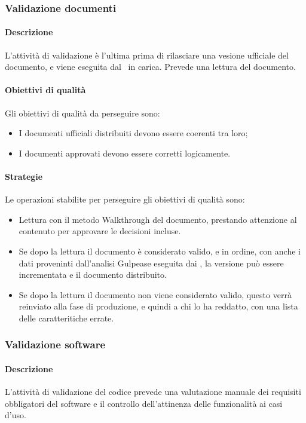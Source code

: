 \documentclass[../NormeDiProgetto_v4.0.0.tex]{subfiles}
\begin{document}
			\subsubsection{Validazione documenti}
				\paragraph{Descrizione}
					L'attività di validazione è l'ultima prima di rilasciare una vesione ufficiale del documento, e viene eseguita dal \responsabilediprogetto\ in carica.
					Prevede una lettura del documento. 
				\paragraph{Obiettivi di qualità}
				Gli obiettivi di qualità da perseguire sono:
				\begin{itemize}
					\item I documenti ufficiali distribuiti devono essere coerenti tra loro;
					\item I documenti approvati devono essere corretti logicamente.
				\end{itemize}

				\paragraph{Strategie}
					Le operazioni stabilite per perseguire gli obiettivi di qualità sono:
					\begin{itemize}
						\item Lettura con il metodo Walkthrough del documento, prestando attenzione al contenuto per approvare le decisioni incluse.
						\item Se dopo la lettura il documento è considerato valido, e in ordine, con anche i dati proveninti dall'analisi Gulpease eseguita dai \verificatori, la versione può essere incrementata e il documento distribuito.
						\item Se dopo la lettura il documento non viene considerato valido, questo verrà reinviato alla fase di produzione, e quindi a chi lo ha reddatto, con una lista delle caratteritiche errate.
					\end{itemize}

			\subsubsection{Validazione software}
				\paragraph{Descrizione}
				L'attività di validazione del codice prevede una valutazione manuale dei requisiti obbligatori del software e il controllo dell'attinenza delle funzionalità ai casi d'uso.
				
\end{document}
